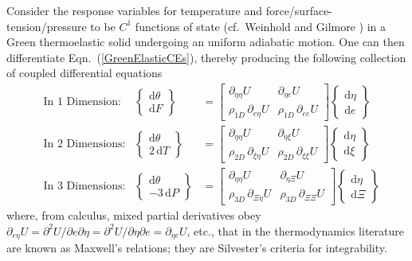Consider the response variables for temperature and force\slash surface-tension\slash pressure to be $C^1$ functions of state (cf.\ Weinhold \cite{Weinhold75c} and Gilmore \cite{Gilmore84}) in a Green thermo\-elastic solid undergoing an uniform adiabatic motion.  One can then differentiate Eqn.~(\ref{GreenElasticCEs}), thereby producing the following collection of coupled differential equations
\begin{subequations}
    \label{GreenElasticODEs}
    \begin{align}
    \mbox{} & \text{In 1 Dimension:} &
    \left\{ \begin{matrix} \mathrm{d} \theta \\ 
    \mathrm{d} F \end{matrix} \right\} & = \begin{bmatrix}
    \partial_{\eta\eta} U & \partial_{\eta e} U \\
    \rho_{1D} \, \partial_{e\eta} U & \rho_{1D} \, \partial_{ee} U \end{bmatrix} 
    \left\{ \begin{matrix} \mathrm{d} \eta \\
    \mathrm{d} e \end{matrix} \right\} \\
    \mbox{} & \text{In 2 Dimensions:} &
    \left\{ \begin{matrix} \mathrm{d} \theta \\ 
    2 \, \mathrm{d} T \end{matrix} \right\} & = \begin{bmatrix}
    \partial_{\eta\eta} U & \partial_{\eta \xi} U \\
    \rho_{2D} \, \partial_{\xi\eta} U & \rho_{2D} \, \partial_{\xi\xi} U \end{bmatrix} \left\{ \begin{matrix} \mathrm{d} \eta \\
    \mathrm{d} \xi \end{matrix} \right\} \label{GreenMembrane} \\
    \mbox{} & \text{In 3 Dimensions:} &
    \left\{ \begin{matrix} \mathrm{d} \theta \\ 
    -3 \, \mathrm{d} P \end{matrix} \right\} & = \begin{bmatrix}
    \partial_{\eta\eta} U & \partial_{\eta \Xi} U \\
    \rho_{3D} \, \partial_{\Xi\eta} U & \rho_{3D} \, \partial_{\Xi\Xi} U \end{bmatrix} \left\{ \begin{matrix} \mathrm{d} \eta \\
    \mathrm{d} \Xi \end{matrix} \right\}
    \end{align}
\end{subequations}
where, from calculus, mixed partial derivatives obey $\partial_{e\eta} U = \partial^2 U / \partial e \partial \eta = \partial^2 U / \partial \eta \partial e = \partial_{\eta e} U$, etc., that in the thermo\-dynamics literature are known as Maxwell's relations; they are Silvester's criteria for integrability.

